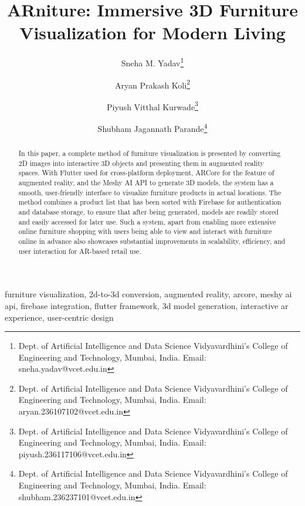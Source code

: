 \documentclass[conference]{IEEEtran}
\begin{document}
\title{ARniture: Immersive 3D Furniture Visualization for Modern Living}

\author{
Sneha M. Yadav\thanks{Dept. of Artificial Intelligence and Data Science Vidyavardhini's College of Engineering and Technology, Mumbai, India. Email: sneha.yadav@vcet.edu.in} \and 
Aryan Prakash Koli\thanks{Dept. of Artificial Intelligence and Data Science Vidyavardhini's College of Engineering and Technology, Mumbai, India. Email: aryan.236107102@vcet.edu.in} \and 
Piyush Vitthal Kurwade\thanks{Dept. of Artificial Intelligence and Data Science Vidyavardhini's College of Engineering and Technology, Mumbai, India. Email: piyush.236117106@vcet.edu.in} \and 
Shubham Jagannath Parande\thanks{Dept. of Artificial Intelligence and Data Science Vidyavardhini's College of Engineering and Technology, Mumbai, India. Email: shubham.236237101@vcet.edu.in}
}

\maketitle

\begin{abstract}
In this paper, a complete method of furniture visualization is presented by converting 2D images into interactive 3D objects and presenting them in augmented reality spaces. With Flutter used for cross-platform deployment, ARCore for the feature of augmented reality, and the Meshy AI API to generate 3D models, the system has a smooth, user-friendly interface to visualize furniture products in actual locations. The method combines a product list that has been sorted with Firebase for authentication and database storage, to ensure that after being generated, models are readily stored and easily accessed for later use. Such a system, apart from enabling more extensive online furniture shopping with users being able to view and interact with furniture online in advance also showcases substantial improvements in scalability, efficiency, and user interaction for AR-based retail use.
\end{abstract}

\begin{IEEEkeywords}
furniture visualization, 2d-to-3d conversion, augmented reality, arcore, meshy ai api, firebase integration, flutter framework, 3d model generation, interactive ar experience, user-centric design
\end{IEEEkeywords}
\end{document}
